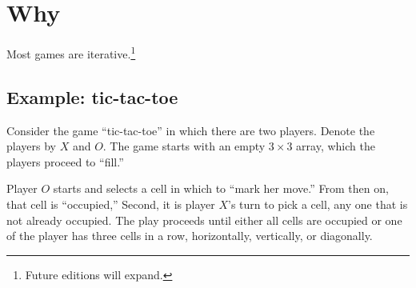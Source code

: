 

\section*{Why}

Most games are iterative.\footnote{Future editions will expand.}

\subsection*{Example: tic-tac-toe}

Consider the game ``tic-tac-toe'' in which there are two players.
Denote the players by $X$ and $O$.
The game starts with an empty $3 \times 3$ array, which the players proceed to ``fill.''

Player $O$ starts and selects a cell in which to ``mark her move.''
From then on, that cell is ``occupied,''
Second, it is player $X$'s turn to pick a cell, any one that is not already occupied.
The play proceeds until either all cells are occupied or one of the player has three cells in a row, horizontally, vertically, or diagonally.

\blankpage